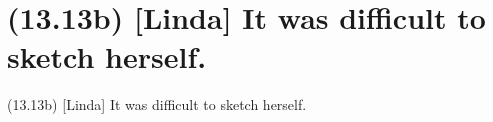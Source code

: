 \documentclass{article}
\begin{document}
\clearpage

%
%

\section*{(13.13b) [Linda] It was difficult to sketch herself.}

\bigbreak
\begin{enumerate*}
\item[(13.13b)] [Linda] It was difficult to sketch herself.
\end{enumerate*}
\bigbreak
\end{document}

